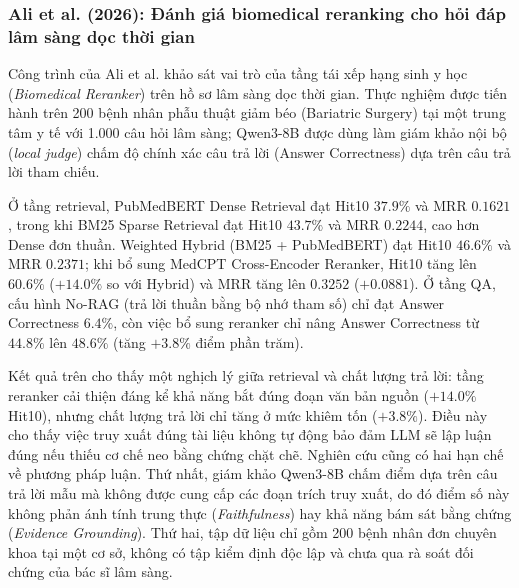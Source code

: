 \subsubsection{Ali et al. (2026): Đánh giá biomedical reranking cho hỏi đáp lâm sàng dọc thời gian}
Công trình của Ali et al. \cite{ali2026biomedical} khảo sát vai trò của tầng tái xếp hạng sinh y học (\emph{Biomedical Reranker}) trên hồ sơ lâm sàng dọc thời gian. Thực nghiệm được tiến hành trên 200 bệnh nhân phẫu thuật giảm béo (Bariatric Surgery) tại một trung tâm y tế với 1.000 câu hỏi lâm sàng; Qwen3-8B được dùng làm giám khảo nội bộ (\emph{local judge}) chấm độ chính xác câu trả lời (Answer Correctness) dựa trên câu trả lời tham chiếu.

Ở tầng retrieval, PubMedBERT Dense Retrieval đạt Hit\@10 $37.9\%$ và MRR $0.1621$, trong khi BM25 Sparse Retrieval đạt Hit\@10 $43.7\%$ và MRR $0.2244$, cao hơn Dense đơn thuần. Weighted Hybrid (BM25 + PubMedBERT) đạt Hit\@10 $46.6\%$ và MRR $0.2371$; khi bổ sung MedCPT Cross-Encoder Reranker, Hit\@10 tăng lên $\mathbf{60.6\%}$ ($+14.0\%$ so với Hybrid) và MRR tăng lên $\mathbf{0.3252}$ ($+0.0881$). Ở tầng QA, cấu hình No-RAG (trả lời thuần bằng bộ nhớ tham số) chỉ đạt Answer Correctness $6.4\%$, còn việc bổ sung reranker chỉ nâng Answer Correctness từ $44.8\%$ lên $48.6\%$ (tăng $+3.8\%$ điểm phần trăm).

Kết quả trên cho thấy một nghịch lý giữa retrieval và chất lượng trả lời: tầng reranker cải thiện đáng kể khả năng bắt đúng đoạn văn bản nguồn ($+14.0\%$ Hit\@10), nhưng chất lượng trả lời chỉ tăng ở mức khiêm tốn ($+3.8\%$). Điều này cho thấy việc truy xuất đúng tài liệu không tự động bảo đảm LLM sẽ lập luận đúng nếu thiếu cơ chế neo bằng chứng chặt chẽ. Nghiên cứu cũng có hai hạn chế về phương pháp luận. Thứ nhất, giám khảo Qwen3-8B chấm điểm dựa trên câu trả lời mẫu mà không được cung cấp các đoạn trích truy xuất, do đó điểm số này không phản ánh tính trung thực (\emph{Faithfulness}) hay khả năng bám sát bằng chứng (\emph{Evidence Grounding}). Thứ hai, tập dữ liệu chỉ gồm 200 bệnh nhân đơn chuyên khoa tại một cơ sở, không có tập kiểm định độc lập và chưa qua rà soát đối chứng của bác sĩ lâm sàng.

